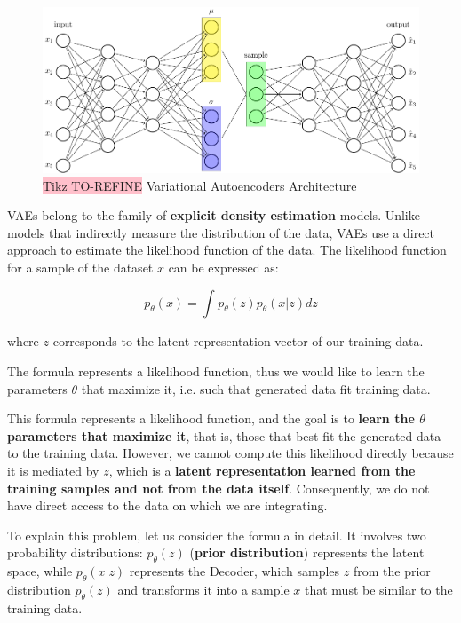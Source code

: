 \begin{figure}[!htbp]
    \centering
    \includegraphics[width=\linewidth]{tikz/chapter9 - Variational Autoencoder.pdf}
    \caption{{\color{red}\colorbox{pink}{Tikz TO-REFINE}} Variational Autoencoders Architecture}
\end{figure}

VAEs belong to the family of \textbf{explicit density estimation} models. Unlike models that indirectly measure the distribution of the data, VAEs use a direct approach to estimate the likelihood function of the data. The likelihood function for a sample of the dataset $x$ can be expressed as:

$$p_{\theta}(x)=\int_{} p_{\theta}(z)p_{\theta}(x|z)dz$$

where $z$ corresponds to the latent representation vector of our training data. 

The formula represents a likelihood function, thus we would like to learn the parameters $\theta$ that maximize it, i.e. such that generated data fit training data.

This formula represents a likelihood function, and the goal is to \textbf{learn the $\theta$ parameters that maximize it}, that is, those that best fit the generated data to the training data. However, we cannot compute this likelihood directly because it is mediated by $z$, which is a \textbf{latent representation learned from the training samples and not from the data itself}. Consequently, we do not have direct access to the data on which we are integrating.


To explain this problem, let us consider the formula in detail. It involves two probability distributions: $p_{\theta}(z)$ (\textbf{prior distribution}) represents the latent space, while $p_{\theta}(x|z)$ represents the Decoder, which samples $z$ from the prior distribution $p_{\theta}(z)$ and transforms it into a sample $x$ that must be similar to the training data.

